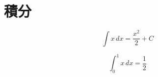 \section{積分}
\begin{equation}
\int x \,dx = \frac{x^2}{2} + C
\end{equation}

\begin{equation}
\int_0^1 x \,dx = \frac{1}{2}
\end{equation}